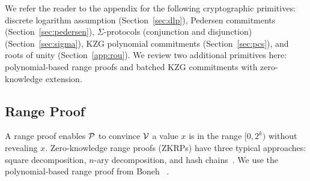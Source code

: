 We refer the reader to the appendix for the following cryptographic primitives: discrete logarithm assumption (Section~\ref{sec:dlp}), Pedersen commitments (Section~\ref{sec:pedersen}), $\Sigma$-protocols (conjunction and disjunction) (Section~\ref{sec:sigma}), KZG polynomial commitments (Section~\ref{sec:pcs}), and roots of unity (Section~\ref{app:rou}). We review two additional primitives here: polynomial-based range proofs and batched KZG commitments with zero-knowledge extension.

\subsection{Range Proof}
\label{sec:range}

A range proof enables $\mathcal{P}$ to convince $\mathcal{V}$ a value $x$ is in the range $[0,2^k)$ without revealing $x$. Zero-knowledge range proofs (ZKRPs) have three typical approaches: square decomposition, $n$-ary decomposition, and hash chains~\cite{zkrp}. We use the polynomial-based range proof from Boneh \etal~\cite{rangeproof}.
